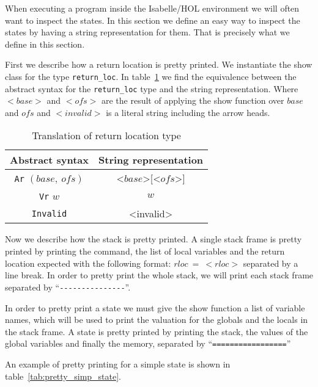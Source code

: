 When executing a program inside the Isabelle/HOL environment we will often want to inspect the states.
In this section we define an easy way to inspect the states by having a string representation for them.
That is precisely what we define in this section.

First we describe how a return location is pretty printed.
We instantiate the show class for the type \verb|return_loc|.
In table~\ref{tab:pretty_rloc} we find the equivalence between the abstract syntax for the \verb|return_loc| type and the string representation.
Where $<base>$ and $<ofs>$ are the result of applying the show function over $base$ and $ofs$ and $<invalid>$ is a literal string including the arrow heads.

\begin{table}[h!]
\centering
\begin{tabular}{|c|c|}
  \hline
  \textbf{Abstract syntax} & \textbf{String representation} \\ [0.5ex]
  \hline \hline
  \verb|Ar| $(base,\ ofs)$ & <$base$>[<$ofs$>] \\
  \verb|Vr| $w$ & $w$ \\
  \verb|Invalid| & <invalid> \\
  \hline
\end{tabular}

\caption{Translation of return location type}
\label{tab:pretty_rloc}
\end{table}

Now we describe how the stack is pretty printed.
A single stack frame is pretty printed by printing the command, the list of local variables and the return location expected with the following format: $rloc\ =\ <rloc>$ separated by a line break.
In order to pretty print the whole stack, we will print each stack frame separated by ``\verb|---------------|''.


In order to pretty print a state we must give the show function a list of variable names, which will be used to print the valuation for the globals and the locals in the stack frame.
A state is pretty printed by printing the stack, the values of the global variables and finally the memory, separated by ``\verb|=================|''

An example of pretty printing for a simple state is shown in table~\ref{tab:pretty_simp_state}.

